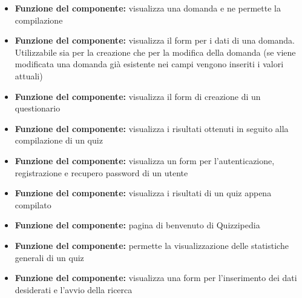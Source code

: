 			\begin{itemize}
				\item\textbf{Funzione del componente:} visualizza una domanda e ne permette la compilazione
			\end{itemize}
			\begin{itemize}
				\item\textbf{Funzione del componente:} visualizza il form per i dati di una domanda. Utilizzabile sia per la creazione che per la modifica della domanda (se viene modificata una domanda già esistente nei campi vengono inseriti i valori attuali)
			\end{itemize}
			\begin{itemize}
				\item\textbf{Funzione del componente:} visualizza il form di creazione di un questionario
			\end{itemize}
			\begin{itemize}
				\item\textbf{Funzione del componente:} visualizza i risultati ottenuti in seguito alla compilazione di un quiz
			\end{itemize}
			\begin{itemize}
				\item\textbf{Funzione del componente:} visualizza un form per l'autenticazione, registrazione e recupero password di un utente
			\end{itemize}
			\begin{itemize}
				\item\textbf{Funzione del componente:} visualizza i risultati di un quiz appena compilato
			\end{itemize}		
			\begin{itemize}
				\item\textbf{Funzione del componente:} pagina di benvenuto di Quizzipedia
			\end{itemize}				
			\begin{itemize}
				\item\textbf{Funzione del componente:} permette la visualizzazione delle statistiche generali di un quiz
			\end{itemize}	
			\begin{itemize}
				\item\textbf{Funzione del componente:} visualizza una form per l’inserimento dei dati desiderati e l’avvio della ricerca
			\end{itemize}								
